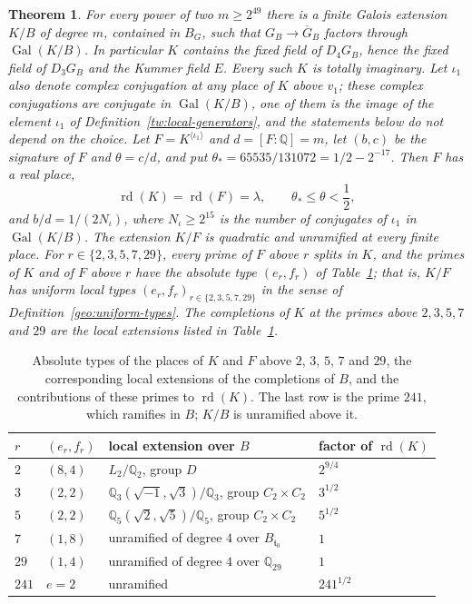 \documentclass[11pt]{amsart}
\numberwithin{equation}{section}
\newtheorem{theorem}[equation]{Theorem}
\theoremstyle{definition}
\theoremstyle{remark}
\DeclareMathOperator{\Gal}{Gal}
\DeclareMathOperator{\rd}{rd}
\newcommand{\Q}{\mathbb Q}
\newcommand{\thetastar}{65535/131072}
\begin{document}
\begin{theorem}\label{tw:field-family}
For every power of two $m\ge2^{49}$ there is a finite Galois extension
$K/B$ of degree $m$, contained in $B_G$, such that $G_B\to\overline G_B$
factors through $\Gal(K/B)$. In particular $K$ contains the fixed field of
$D_4G_B$, hence the fixed field of $D_3G_B$ and the Kummer field $E$. Every
such $K$ is totally imaginary. Let $\iota_1$ also denote complex
conjugation at any place of $K$ above $v_1$; these complex conjugations are
conjugate in $\Gal(K/B)$, one of them is the image of the element $\iota_1$
of Definition~\ref{tw:local-generators}, and the statements below do not
depend on the choice. Let $F=K^{\langle\iota_1\rangle}$ and
$d=[F:\Q]=m$, let $(b,c)$ be the signature of $F$ and $\theta=c/d$, and put
$\theta_*=\thetastar=1/2-2^{-17}$. Then $F$ has a real place,
\[
 \rd(K)=\rd(F)=\lambda,\qquad \theta_*\le\theta<\frac12 ,
\]
and $b/d=1/(2N_\iota)$, where $N_\iota\ge2^{15}$ is the number of conjugates
of $\iota_1$ in $\Gal(K/B)$. The extension $K/F$ is quadratic and unramified
at every finite place. For $r\in\{2,3,5,7,29\}$, every prime of $F$ above $r$
splits in $K$, and the primes of $K$ and of $F$ above $r$ have the absolute
type $(e_r,f_r)$ of Table~\ref{tw:types-table}; that is, $K/F$ has uniform
local types $(e_r,f_r)_{r\in\{2,3,5,7,29\}}$ in the sense of
Definition~\ref{geo:uniform-types}. The completions of $K$ at the primes above
$2,3,5,7$ and $29$ are the local extensions listed in
Table~\ref{tw:types-table}.
\end{theorem}

\begin{table}[htbp]
\centering
\caption{Absolute types of the places of $K$ and $F$ above $2$, $3$, $5$, $7$
and $29$, the corresponding local extensions of the completions of $B$, and
the contributions of these primes to $\rd(K)$. The last row is the prime
$241$, which ramifies in $B$; $K/B$ is unramified above it.}
\label{tw:types-table}
\begin{tabular}{llll}
\toprule
$r$ & $(e_r,f_r)$ & local extension over $B$ & factor of $\rd(K)$\\
\midrule
$2$ & $(8,4)$ & $L_2/\Q_2$, group $D$ & $2^{9/4}$\\
$3$ & $(2,2)$ & $\Q_3(\sqrt{-1},\sqrt3)/\Q_3$, group $C_2\times C_2$ & $3^{1/2}$\\
$5$ & $(2,2)$ & $\Q_5(\sqrt2,\sqrt5)/\Q_5$, group $C_2\times C_2$ & $5^{1/2}$\\
$7$ & $(1,8)$ & unramified of degree $4$ over $B_{\mathfrak t_0}$ & $1$\\
$29$ & $(1,4)$ & unramified of degree $4$ over $\Q_{29}$ & $1$\\
\midrule
$241$ & $e=2$ & unramified & $241^{1/2}$\\
\bottomrule
\end{tabular}
\end{table}
\end{document}

